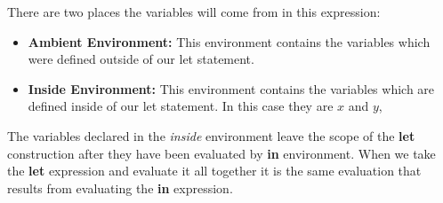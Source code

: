 There are two places the variables will come from in this expression:
\begin{itemize}
\item \textbf{Ambient Environment:} This environment contains the variables which were defined outside of our let statement. 
\item \textbf{Inside Environment:} This environment contains the variables which are defined inside of our let statement. In this case they are $x$ and $y$,
\end{itemize}

The variables declared in the \emph{inside} environment leave the scope of the \textbf{let} construction after they have been evaluated by \textbf{in} environment. When we take the \textbf{let} expression and evaluate it all together it is the same evaluation that results from evaluating the \textbf{in} expression. 

 